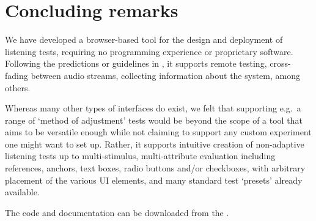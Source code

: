 \documentclass{sig-alternate}
\begin{document}
\section{Concluding remarks}
\label{sec:conclusion}

	We have developed a browser-based tool for the design and deployment of listening tests, requiring no programming experience or proprietary software. Following the predictions or guidelines in \cite{schoeffler2015mushra}, it supports remote testing, cross-fading between audio streams, collecting information about the system, among others. 

	Whereas many other types of interfaces do exist, we felt that supporting e.g.~a range of `method of adjustment' tests would be beyond the scope of a tool that aims to be versatile enough while not claiming to support any custom experiment one might want to set up. Rather, it supports intuitive creation of non-adaptive listening tests up to multi-stimulus, multi-attribute evaluation including references, anchors, text boxes, radio buttons and/or checkboxes, with arbitrary placement of the various UI elements, and many standard test `presets' already available.
	
	The code and documentation can be downloaded from the .

%

\small
%
%
\end{document}
